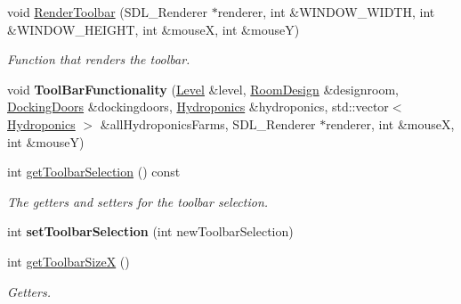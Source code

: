 \begin{DoxyCompactItemize}
\item 
\mbox{\label{class_tool_bar_a224d1f79e59de7c3e4e322f6f078abc0}} 
void \hyperlink{class_tool_bar_a224d1f79e59de7c3e4e322f6f078abc0}{Render\+Toolbar} (S\+D\+L\+\_\+\+Renderer $\ast$renderer, int \&W\+I\+N\+D\+O\+W\+\_\+\+W\+I\+D\+TH, int \&W\+I\+N\+D\+O\+W\+\_\+\+H\+E\+I\+G\+HT, int \&mouseX, int \&mouseY)
\begin{DoxyCompactList}\small\item\em Function that renders the toolbar. \end{DoxyCompactList}\item 
\mbox{\label{class_tool_bar_a1a8a8f07ea9d3173804636a13f71ea2a}} 
void {\bfseries Tool\+Bar\+Functionality} (\hyperlink{class_level}{Level} \&level, \hyperlink{class_room_design}{Room\+Design} \&designroom, \hyperlink{class_docking_doors}{Docking\+Doors} \&dockingdoors, \hyperlink{class_hydroponics}{Hydroponics} \&hydroponics, std\+::vector$<$ \hyperlink{class_hydroponics}{Hydroponics} $>$ \&all\+Hydroponics\+Farms, S\+D\+L\+\_\+\+Renderer $\ast$renderer, int \&mouseX, int \&mouseY)
\item 
\mbox{\label{class_tool_bar_ae8124fd65ff427d4ebe91a3fe527b346}} 
int \hyperlink{class_tool_bar_ae8124fd65ff427d4ebe91a3fe527b346}{get\+Toolbar\+Selection} () const
\begin{DoxyCompactList}\small\item\em The getters and setters for the toolbar selection. \end{DoxyCompactList}\item 
\mbox{\label{class_tool_bar_a60072cabff543469021f6c96e01c0ae2}} 
int {\bfseries set\+Toolbar\+Selection} (int new\+Toolbar\+Selection)
\item 
\mbox{\label{class_tool_bar_af2d73f6b3b39033f22f53e88502c0ff7}} 
int \hyperlink{class_tool_bar_af2d73f6b3b39033f22f53e88502c0ff7}{get\+Toolbar\+SizeX} ()
\begin{DoxyCompactList}\small\item\em Getters. \end{DoxyCompactList}\item 
\mbox{\label{class_tool_bar_a765fc1fd92c33e1bf4ee1655a3cbf513}} 

\end{DoxyCompactItemize}
